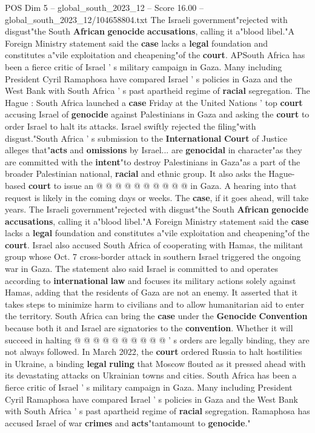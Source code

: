 \begin{textsample}{POS Dim 5 – global\_south\_2023\_12 – Score 16.00 – global\_south\_2023\_12/104658804.txt}  \label{ex:f5_pos_107}
The Israeli government"rejected with disgust"the South \textbf{African} \textbf{genocide} \textbf{accusations}, calling it a"blood libel."A Foreign Ministry statement said the \textbf{case} lacks a \textbf{legal} foundation and constitutes a"vile exploitation and cheapening"of the \textbf{court}.
APSouth Africa has been a fierce critic of Israel ' s military campaign in Gaza.
Many including President Cyril Ramaphosa have compared Israel ' s policies in Gaza and the West Bank with South Africa ' s past apartheid regime of \textbf{racial} segregation.
The Hague : South Africa launched a \textbf{case} Friday at the United Nations ' top \textbf{court} accusing Israel of \textbf{genocide} against Palestinians in Gaza and asking the \textbf{court} to order Israel to halt its attacks.
Israel swiftly rejected the filing"with disgust."South Africa ' s submission to the \textbf{International} \textbf{Court} of Justice alleges that"\textbf{acts} and \textbf{omissions} by Israel... are \textbf{genocidal} in character"as they are committed with the \textbf{intent}"to destroy Palestinians in Gaza"as a part of the broader Palestinian national, \textbf{racial} and ethnic group.
It also asks the Hague-based \textbf{court} to issue an @ @ @ @ @ @ @ @ @ @ in Gaza.
A hearing into that request is likely in the coming days or weeks.
The \textbf{case}, if it goes ahead, will take years.
The Israeli government"rejected with disgust"the South \textbf{African} \textbf{genocide} \textbf{accusations}, calling it a"blood libel."A Foreign Ministry statement said the \textbf{case} lacks a \textbf{legal} foundation and constitutes a"vile exploitation and cheapening"of the \textbf{court}.
Israel also accused South Africa of cooperating with Hamas, the militant group whose Oct. 7 cross-border attack in southern Israel triggered the ongoing war in Gaza.
The statement also said Israel is committed to and operates according to \textbf{international} \textbf{law} and focuses its military actions solely against Hamas, adding that the residents of Gaza are not an enemy.
It asserted that it takes steps to minimize harm to civilians and to allow humanitarian aid to enter the territory.
South Africa can bring the \textbf{case} under the \textbf{Genocide} \textbf{Convention} because both it and Israel are signatories to the \textbf{convention}.
Whether it will succeed in halting @ @ @ @ @ @ @ @ @ @ ' s orders are legally binding, they are not always followed.
In March 2022, the \textbf{court} ordered Russia to halt hostilities in Ukraine, a binding \textbf{legal} \textbf{ruling} that Moscow flouted as it pressed ahead with its devastating attacks on Ukrainian towns and cities.
South Africa has been a fierce critic of Israel ' s military campaign in Gaza.
Many including President Cyril Ramaphosa have compared Israel ' s policies in Gaza and the West Bank with South Africa ' s past apartheid regime of \textbf{racial} segregation.
Ramaphosa has accused Israel of war \textbf{crimes} and \textbf{acts}"tantamount to \textbf{genocide}."

\end{textsample}
